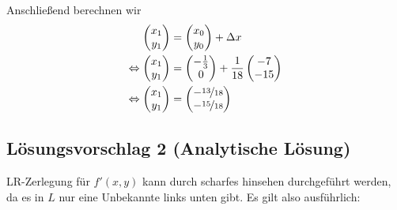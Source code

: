 Anschließend berechnen wir
\begin{align}
	\begin{pmatrix}
		x_1\\
		y_1
	\end{pmatrix} &=
	\begin{pmatrix}
		x_0\\
		y_0
	\end{pmatrix}+\Delta x \\
	\Leftrightarrow\begin{pmatrix}
		x_1\\
		y_1
	\end{pmatrix} &=
	\begin{pmatrix}
		-\frac{1}{3}\\
		0
	\end{pmatrix} +
    \frac{1}{18}
	\begin{pmatrix}
		-7\\
		-15
	\end{pmatrix} \\
	\Leftrightarrow\begin{pmatrix}
		x_1\\
		y_1
	\end{pmatrix} &=
	\begin{pmatrix}
		-\nicefrac{13}{18}\\
		-\nicefrac{15}{18}
	\end{pmatrix}
\end{align}


\subsection*{Lösungsvorschlag 2 (Analytische Lösung)}
LR-Zerlegung für $f'(x, y)$ kann durch scharfes hinsehen durchgeführt
werden, da es in $L$ nur eine Unbekannte links unten gibt. Es gilt
also ausführlich:

